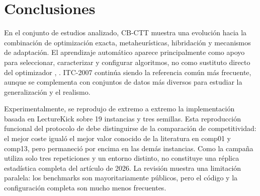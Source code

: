 \documentclass[journal]{IEEEtran}
\begin{document}
\section{Conclusiones}

En el conjunto de estudios analizado, CB-CTT muestra una evolución hacia la combinación de optimización exacta, metaheurísticas, hibridación y mecanismos de adaptación. El aprendizaje automático aparece principalmente como apoyo para seleccionar, caracterizar y configurar algoritmos, no como sustituto directo del optimizador \cite{ref17}, \cite{ref4}. ITC-2007 continúa siendo la referencia común más frecuente, aunque se complementa con conjuntos de datos más diversos para estudiar la generalización y el realismo.


Experimentalmente, se reprodujo de extremo a extremo la implementación basada en LectureKick sobre 19 instancias y tres semillas. Esta reproducción funcional del protocolo de \cite{ref18} debe distinguirse de la comparación de competitividad: el mejor coste igualó el mejor valor conocido de la literatura en comp01 y comp13, pero permaneció por encima en las demás instancias. Como la campaña utiliza solo tres repeticiones y un entorno distinto, no constituye una réplica estadística completa del artículo de 2026. La revisión muestra una limitación paralela: los benchmarks son mayoritariamente públicos, pero el código y la configuración completa son mucho menos frecuentes.


\balance
\end{document}
